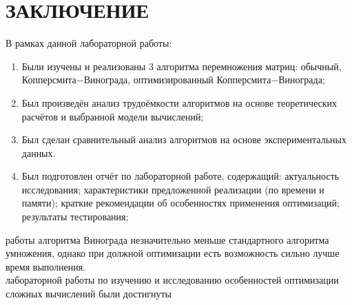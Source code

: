 \chapter*{ЗАКЛЮЧЕНИЕ}

В рамках данной лабораторной работы:

\begin{enumerate}
    \item Были изучены и реализованы 3 алгоритма перемножения матриц: обычный, Копперсмита$-$Винограда, оптимизированный Копперсмита$-$Винограда;
    \item Был произведён анализ трудоёмкости алгоритмов на основе теоретических расчётов и выбранной модели вычислений;
    \item Был сделан сравнительный анализ алгоритмов на основе экспериментальных данных.
    \item Был подготовлен отчёт по лабораторной работе, содержащий: актуальность исследования; характеристики предложенной реализации (по времени и памяти);
    краткие рекомендации об особенностях применения оптимизаций;
    результаты тестирования;
\end{enumerate}
\indent{} работы алгоритма Винограда незначительно меньше стандартного алгоритма умножения, однако при должной оптимизации есть возможность сильно лучше время выполнения.
\\
 лабораторной работы по изучению и исследованию особенностей оптимизации сложных вычислений были достигнуты